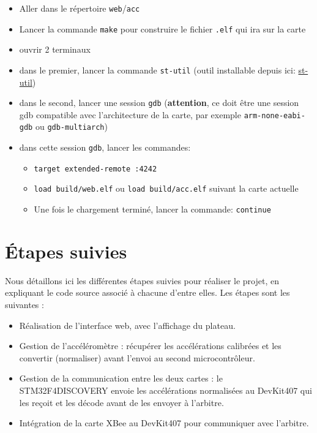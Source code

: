 \documentclass[12pt,french]{article}
\begin{document}
\begin{itemize}
    \item Aller dans le répertoire \texttt{web}/\texttt{acc} 
    \item Lancer la commande \texttt{make} pour construire le fichier \texttt{.elf} qui ira sur la carte
    \item ouvrir 2 terminaux
    \item dans le premier, lancer la commande \texttt{st-util} (outil installable depuis ici: \href{https://github.com/texane/stlink}{st-util})
    \item dans le second, lancer une session \texttt{gdb} (\textbf{attention}, ce doit être une session gdb compatible avec l'architecture de la carte, par exemple \texttt{arm-none-eabi-gdb} ou \texttt{gdb-multiarch})
    \item dans cette session \texttt{gdb}, lancer les commandes: 
    \begin{itemize}
        \item \texttt{target extended-remote :4242}
        \item \texttt{load build/web.elf} ou \texttt{load build/acc.elf} suivant la carte actuelle
        \item Une fois le chargement terminé, lancer la commande: \texttt{continue}
    \end{itemize}
\end{itemize}

\section{Étapes suivies}

Nous détaillons ici les différentes étapes suivies pour réaliser le projet, en expliquant le code source associé à chacune d'entre elles. Les étapes sont les suivantes :

\begin{itemize}
    \item Réalisation de l'interface web, avec l'affichage du plateau.
    \item Gestion de l'accéléromètre : récupérer les accélérations calibrées et les convertir (normaliser) avant l'envoi au second microcontrôleur.
    \item Gestion de la communication entre les deux cartes : le STM32F4DISCOVERY envoie les accélérations normalisées au DevKit407 qui les reçoit et les décode avant de les envoyer à l'arbitre.
    \item Intégration de la carte XBee au DevKit407 pour communiquer avec l'arbitre.
\end{itemize}
\end{document}
